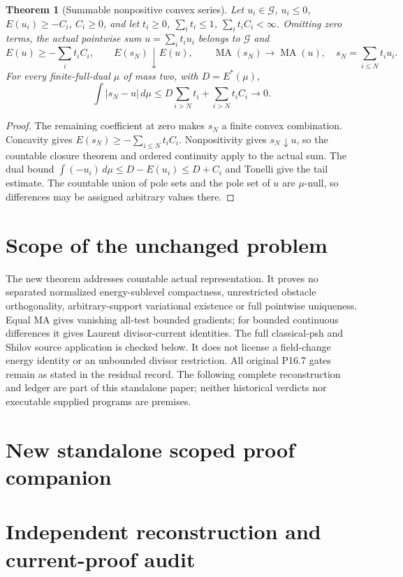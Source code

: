 \documentclass[11pt]{article}
\newtheorem{theorem}{Theorem}
\newcommand{\G}{\mathcal G}
\newcommand{\MA}{\operatorname{MA}}
\begin{document}
\begin{theorem}[Summable nonpositive convex series]
Let $u_i\in\G$, $u_i\leq0$, $E(u_i)\geq-C_i$, $C_i\geq0$, and let
$t_i\geq0$, $\sum_i t_i\leq1$, $\sum_it_iC_i<\infty$. Omitting zero
terms, the actual pointwise sum $u=\sum_it_iu_i$ belongs to $\G$ and
\[
 E(u)\geq-\sum_it_iC_i,\qquad
 E(s_N)\downarrow E(u),\qquad\MA(s_N)\to\MA(u),
 \quad s_N=\sum_{i\leq N}t_iu_i.
\]
For every finite-full-dual $\mu$ of mass two, with $D=E^*(\mu)$,
\[
 \int|s_N-u|\,d\mu
 \leq D\sum_{i>N}t_i+\sum_{i>N}t_iC_i\longrightarrow0.
\]
\end{theorem}
\begin{proof}
The remaining coefficient at zero makes $s_N$ a finite convex combination.
Concavity gives $E(s_N)\geq-\sum_{i\leq N}t_iC_i$. Nonpositivity gives
$s_N\downarrow u$, so the countable closure theorem and ordered continuity
apply to the actual sum. The dual bound
$\int(-u_i)\,d\mu\leq D-E(u_i)\leq D+C_i$ and Tonelli give the tail
estimate. The countable union of pole sets and the pole set of $u$ are
$\mu$-null, so differences may be assigned arbitrary values there.
\end{proof}

\section*{Scope of the unchanged problem}
The new theorem addresses countable actual representation. It proves no
separated normalized energy-sublevel compactness, unrestricted obstacle
orthogonality, arbitrary-support variational existence or full pointwise
uniqueness. Equal MA gives vanishing all-test bounded gradients; for bounded
continuous differences it gives Laurent divisor-current identities.
The full classical-psh and Shilov source application is checked below.
It does not license a field-change energy identity or an unbounded divisor
restriction. All original P16.7 gates remain as stated in the residual record.
The following complete reconstruction and ledger are part of this standalone
paper; neither historical verdicts nor executable supplied programs are premises.

\section*{New standalone scoped proof companion}

\section*{Independent reconstruction and current-proof audit}
\end{document}
